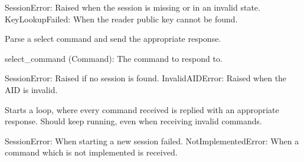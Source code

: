 \documentclass[letterpaper,10pt,english]{sphinxmanual}
\begin{document}
\begin{fulllineitems}
\begin{fulllineitems}
\begin{description}
\sphinxAtStartPar
SessionError: Raised when the session is missing or in an invalid state.
KeyLookupFailed: When the reader public key cannot be found.

\end{description}

\end{fulllineitems}


\begin{fulllineitems}
\label{\detokenize{aliro_actuator.access_protocol.user_device:aliro_actuator.access_protocol.user_device.UserDevice.handle_select}}
\pysigstartsignatures
{}
\pysigstopsignatures
\sphinxAtStartPar
Parse a select command and send the appropriate response.
\begin{description}
\sphinxAtStartPar
select\_command (Command): The command to respond to.

\sphinxAtStartPar
SessionError: Raised if no session is found.
InvalidAIDError: Raised when the AID is invalid.

\end{description}

\end{fulllineitems}


\begin{fulllineitems}
\label{\detokenize{aliro_actuator.access_protocol.user_device:aliro_actuator.access_protocol.user_device.UserDevice.main_loop}}
\pysigstartsignatures
{}
\pysigstopsignatures
\sphinxAtStartPar
Starts a loop, where every command received is replied with an appropriate response.
Should keep running, even when receiving invalid commands.
\begin{description}
\sphinxAtStartPar
SessionError: When starting a new session failed.
NotImplementedError: When a command which is not implemented is received.


\end{description}
\end{fulllineitems}
\end{fulllineitems}
\end{document}
